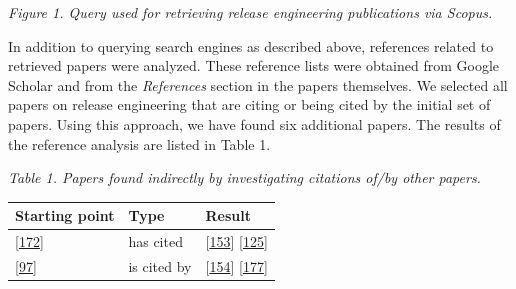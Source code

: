 \documentclass[]{book}
\begin{document}
\emph{Figure 1. Query used for retrieving release engineering
publications via Scopus.}

In addition to querying search engines as described above, references
related to retrieved papers were analyzed. These reference lists were
obtained from Google Scholar and from the \emph{References} section in
the papers themselves. We selected all papers on release engineering
that are citing or being cited by the initial set of papers. Using this
approach, we have found six additional papers. The results of the
reference analysis are listed in Table 1.

\emph{Table 1. Papers found indirectly by investigating citations of/by
other papers.}

\begin{longtable}[]{@{}lll@{}}
\toprule
\begin{minipage}[b]{0.23\columnwidth}\raggedright\strut
Starting point\strut
\end{minipage} & \begin{minipage}[b]{0.18\columnwidth}\raggedright\strut
Type\strut
\end{minipage} & \begin{minipage}[b]{0.25\columnwidth}\raggedright\strut
Result\strut
\end{minipage}\tabularnewline
\midrule
\endhead
\begin{minipage}[t]{0.23\columnwidth}\raggedright\strut
{[}\protect\hyperlink{ref-souza2015a}{172}{]}\strut
\end{minipage} & \begin{minipage}[t]{0.18\columnwidth}\raggedright\strut
has cited\strut
\end{minipage} & \begin{minipage}[t]{0.25\columnwidth}\raggedright\strut
{[}\protect\hyperlink{ref-plewnia2014a}{153}{]}
{[}\protect\hyperlink{ref-mantyla2015a}{125}{]}\strut
\end{minipage}\tabularnewline
\begin{minipage}[t]{0.23\columnwidth}\raggedright\strut
{[}\protect\hyperlink{ref-khomh2015a}{97}{]}\strut
\end{minipage} & \begin{minipage}[t]{0.18\columnwidth}\raggedright\strut
is cited by\strut
\end{minipage} & \begin{minipage}[t]{0.25\columnwidth}\raggedright\strut
{[}\protect\hyperlink{ref-poo-caamano2016a}{154}{]}
{[}\protect\hyperlink{ref-teixeira2017a}{177}{]}\strut
\end{minipage}\tabularnewline

\end{longtable}
\end{document}
